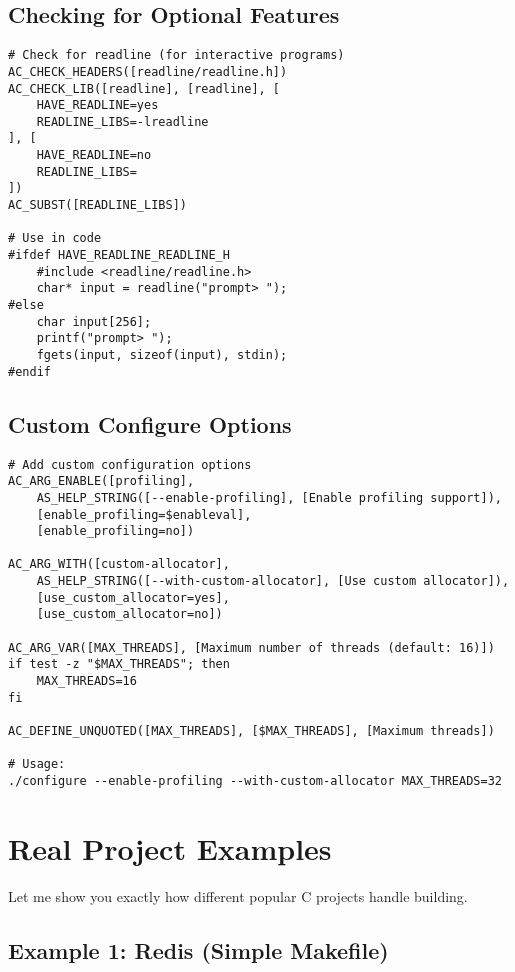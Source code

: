 \subsection{Checking for Optional Features}

\begin{lstlisting}
# Check for readline (for interactive programs)
AC_CHECK_HEADERS([readline/readline.h])
AC_CHECK_LIB([readline], [readline], [
    HAVE_READLINE=yes
    READLINE_LIBS=-lreadline
], [
    HAVE_READLINE=no
    READLINE_LIBS=
])
AC_SUBST([READLINE_LIBS])

# Use in code
#ifdef HAVE_READLINE_READLINE_H
    #include <readline/readline.h>
    char* input = readline("prompt> ");
#else
    char input[256];
    printf("prompt> ");
    fgets(input, sizeof(input), stdin);
#endif
\end{lstlisting}

\subsection{Custom Configure Options}

\begin{lstlisting}
# Add custom configuration options
AC_ARG_ENABLE([profiling],
    AS_HELP_STRING([--enable-profiling], [Enable profiling support]),
    [enable_profiling=$enableval],
    [enable_profiling=no])

AC_ARG_WITH([custom-allocator],
    AS_HELP_STRING([--with-custom-allocator], [Use custom allocator]),
    [use_custom_allocator=yes],
    [use_custom_allocator=no])

AC_ARG_VAR([MAX_THREADS], [Maximum number of threads (default: 16)])
if test -z "$MAX_THREADS"; then
    MAX_THREADS=16
fi

AC_DEFINE_UNQUOTED([MAX_THREADS], [$MAX_THREADS], [Maximum threads])

# Usage:
./configure --enable-profiling --with-custom-allocator MAX_THREADS=32
\end{lstlisting}

\section{Real Project Examples}

Let me show you exactly how different popular C projects handle building.

\subsection{Example 1: Redis (Simple Makefile)}

